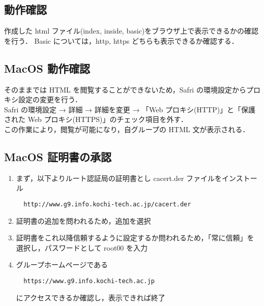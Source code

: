 \documentclass[a4j,titlepage]{jarticle}
\begin{document}
\subsection{動作確認}
作成した html ファイル(index, inside, basic)をブラウザ上で表示できるかの確認を行う．
Basic については，http, https どちらも表示できるか確認する．

\subsection{MacOS 動作確認}
そのままでは HTML を閲覧することができないため，Safri の環境設定からプロキシ設定の変更を行う．\\
Safri の環境設定 → 詳細 → 詳細を変更 → 「Web プロキシ(HTTP)」と「保護された Web プロキシ(HTTPS)」のチェック項目を外す．\\
この作業により，閲覧が可能になり，自グループの HTML 文が表示される．

\subsection{MacOS 証明書の承認}
\begin{enumerate}
\item まず，以下よりルート認証局の証明書とし cacert.der ファイルをインストール
  \begin{center}
    \begin{screen}
\begin{verbatim}
  http://www.g9.info.kochi-tech.ac.jp/cacert.der
\end{verbatim}
    \end{screen}
  \end{center}

\item 証明書の追加を問われるため，追加を選択

\item 証明書をこれ以降信頼するように設定するか問われるため，「常に信頼」を選択し，パスワードとして root00 を入力

\item グループホームページである
  \begin{center}
    \begin{screen}
\begin{verbatim}
  https://www.g9.info.kochi-tech.ac.jp
\end{verbatim}
    \end{screen}
  \end{center}
にアクセスできるか確認し，表示できれば終了
  
\end{enumerate}
\end{document}
